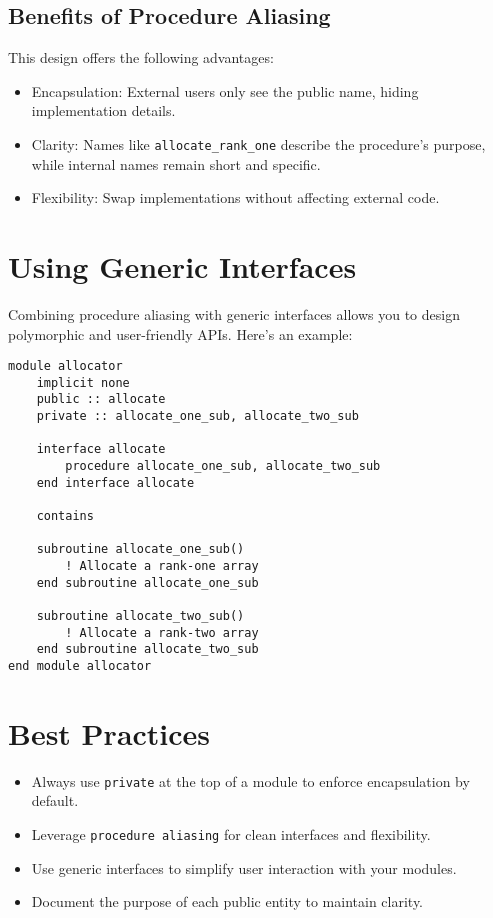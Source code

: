 \subsection{Benefits of Procedure Aliasing}
This design offers the following advantages:
\begin{itemize}
    \item Encapsulation: External users only see the public name, hiding implementation details.
    \item Clarity: Names like \texttt{allocate\_rank\_one} describe the procedure's purpose, while internal names remain short and specific.
    \item Flexibility: Swap implementations without affecting external code.
\end{itemize}

\section{Using Generic Interfaces}
Combining procedure aliasing with generic interfaces allows you to design polymorphic and user-friendly APIs. Here's an example:

\begin{lstlisting}
module allocator
    implicit none
    public :: allocate
    private :: allocate_one_sub, allocate_two_sub

    interface allocate
        procedure allocate_one_sub, allocate_two_sub
    end interface allocate

    contains

    subroutine allocate_one_sub()
        ! Allocate a rank-one array
    end subroutine allocate_one_sub

    subroutine allocate_two_sub()
        ! Allocate a rank-two array
    end subroutine allocate_two_sub
end module allocator
\end{lstlisting}

\section{Best Practices}
\begin{itemize}
    \item Always use \texttt{private} at the top of a module to enforce encapsulation by default.
    \item Leverage \texttt{procedure aliasing} for clean interfaces and flexibility.
    \item Use generic interfaces to simplify user interaction with your modules.
    \item Document the purpose of each public entity to maintain clarity.
\end{itemize}

\endinput  %
